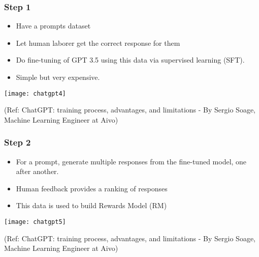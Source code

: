 \begin{frame}[fragile]\frametitle{Step 1}

\begin{itemize}
\item Have a prompts dataset 
\item Let human laborer get the correct response for them
\item Do fine-tuning of GPT 3.5 using this data via supervised learning (SFT). 
\item Simple but very expensive.
\end{itemize}	 

			\begin{center}
			\texttt{[image: chatgpt4]}
			
			\end{center}		
			
			{\tiny (Ref: ChatGPT: training process, advantages, and limitations - By Sergio Soage, Machine Learning Engineer at Aivo)}
			
\end{frame}

\begin{frame}[fragile]\frametitle{Step 2}

\begin{itemize}
\item For a prompt, generate multiple responses from the fine-tuned model, one after another.
\item Human feedback provides a ranking of responses
\item This data is used to build Rewards Model (RM)
\end{itemize}	 

			\begin{center}
			\texttt{[image: chatgpt5]}
			
			\end{center}		
			
			{\tiny (Ref: ChatGPT: training process, advantages, and limitations - By Sergio Soage, Machine Learning Engineer at Aivo)}
			
\end{frame}




